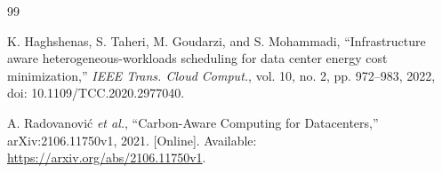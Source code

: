 \documentclass{UNCC-thesis}
\begin{document}
\begin{thebibliography}{99}





K. Haghshenas, S. Taheri, M. Goudarzi, and S. Mohammadi, ``Infrastructure
aware heterogeneous-workloads scheduling for data center energy cost
minimization,'' \emph{IEEE Trans. Cloud Comput.}, vol. 10, no. 2,
pp. 972--983, 2022, doi: 10.1109/TCC.2020.2977040.

A. Radovanovi\'{c} \emph{et al.}, ``Carbon-Aware Computing for Datacenters,''
arXiv:2106.11750v1, 2021. [Online]. Available:
\url{https://arxiv.org/abs/2106.11750v1}.




\end{thebibliography}
\end{document}
